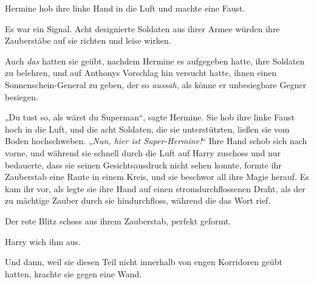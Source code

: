 Hermine hob ihre linke Hand in die Luft und machte eine Faust.

Es war ein Signal. Acht designierte Soldaten aus ihrer Armee würden ihre Zauberstäbe auf sie richten und leise  wirken.

Auch \emph{das} hatten sie geübt, nachdem Hermine es aufgegeben hatte, ihre Soldaten zu belehren, und auf Anthonys Vorschlag hin versucht hatte, ihnen einen Sonnenschein-General zu geben, der so \emph{aussah}, als könne er unbesiegbare Gegner besiegen.

„Du tust so, als wärst du Superman“, sagte Hermine. Sie hob ihre linke Faust hoch in die Luft, und die acht Soldaten, die sie unterstützten, ließen sie vom Boden hochschweben. „\emph{Nun, hier ist Super-Hermine!}“ Ihre Hand schob sich nach vorne, und während sie schnell durch die Luft auf Harry zuschoss und nur bedauerte, dass sie seinen Gesichtsausdruck nicht sehen konnte, formte ihr Zauberstab eine Raute in einem Kreis, und sie beschwor all ihre Magie herauf. Es kam ihr vor, als legte sie ihre Hand auf einen stromdurchflossenen Draht, als der zu mächtige Zauber durch sie hindurchfloss, während die das Wort  rief.

Der rote Blitz schoss aus ihrem Zauberstab, perfekt geformt.

Harry wich ihm aus.

Und dann, weil sie diesen Teil nicht innerhalb von engen Korridoren geübt hatten, krachte sie gegen eine Wand.

